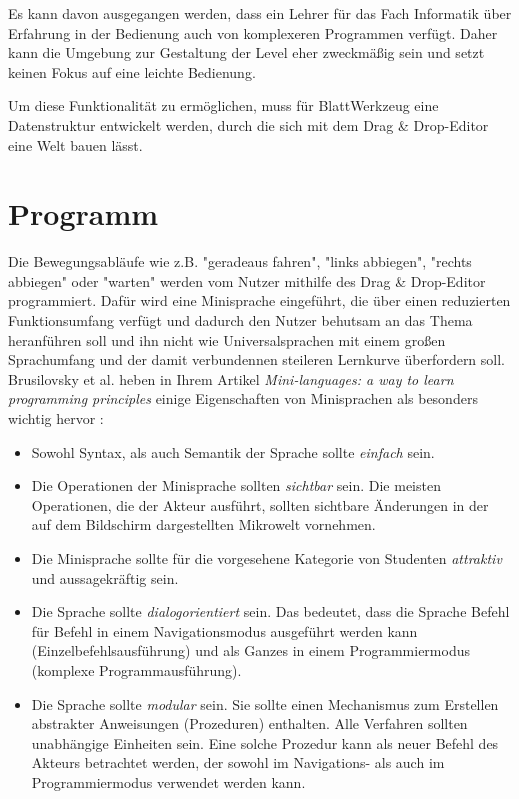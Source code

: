 Es kann davon ausgegangen werden, dass ein Lehrer für das Fach Informatik über Erfahrung in der Bedienung auch von komplexeren Programmen verfügt. Daher kann die Umgebung zur Gestaltung der Level eher zweckmäßig sein und setzt keinen Fokus auf eine leichte Bedienung.

Um diese Funktionalität zu ermöglichen, muss für BlattWerkzeug eine Datenstruktur entwickelt werden, durch die sich mit dem Drag \& Drop-Editor eine Welt bauen lässt.

\section{Programm}
\label{sec:requirements:program}

Die Bewegungsabläufe wie z.B. "geradeaus fahren", "links abbiegen", "rechts abbiegen" oder "warten" werden vom Nutzer mithilfe des Drag \& Drop-Editor programmiert. Dafür wird eine Minisprache eingeführt, die über einen reduzierten Funktionsumfang verfügt und dadurch den Nutzer behutsam an das Thema heranführen soll und ihn nicht wie Universalsprachen mit einem großen Sprachumfang und der damit verbundennen steileren Lernkurve überfordern soll. Brusilovsky et al. heben in Ihrem Artikel \textit{Mini-languages: a way to learn programming principles} einige Eigenschaften von Minisprachen als besonders wichtig hervor \cite[73-74]{brusilovsky1997}:

\begin{itemize}
    \item Sowohl Syntax, als auch Semantik der Sprache sollte \emph{einfach} sein.
    \item Die Operationen der Minisprache sollten \emph{sichtbar} sein. Die meisten Operationen, die der Akteur ausführt, sollten sichtbare Änderungen in der auf dem Bildschirm dargestellten Mikrowelt vornehmen.
    \item Die Minisprache sollte für die vorgesehene Kategorie von Studenten \emph{attraktiv} und aussagekräftig sein.
    \item Die Sprache sollte \emph{dialogorientiert} sein. Das bedeutet, dass die Sprache Befehl für Befehl in einem Navigationsmodus ausgeführt werden kann (Einzelbefehlsausführung) und als Ganzes in einem Programmiermodus (komplexe Programmausführung).
    \item Die Sprache sollte \emph{modular} sein. Sie sollte einen Mechanismus zum Erstellen abstrakter Anweisungen (Prozeduren) enthalten. Alle Verfahren sollten unabhängige Einheiten sein. Eine solche Prozedur kann als neuer Befehl des Akteurs betrachtet werden, der sowohl im Navigations- als auch im Programmiermodus verwendet werden kann.
\end{itemize}

